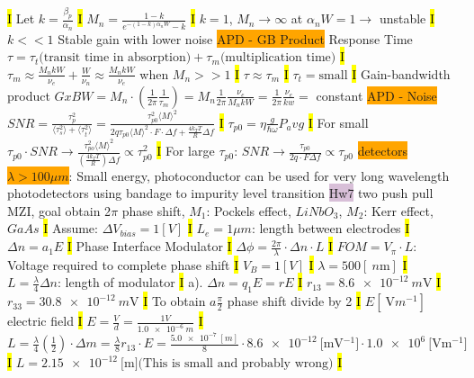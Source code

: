 \documentclass[fontsize=3]{scrartcl}
\begin{document}
\hl{I}
Let $k = \frac{\beta_p}{\alpha_n}$
\hl{I}
$M_n = \frac{1-k}{e^{-(1-k)\alpha_n W} - k}$
\hl{I}
$k=1$, $M_n \rightarrow \infty$ at $\alpha_n W = 1 \rightarrow $ unstable
\hl{I}
$k << 1$ Stable gain with lower noise 
\colorbox{Orange}{APD - GB Product}
Response Time $\tau = \tau_t \text{(transit time in absorption)} + \tau_m \text{(multiplication time)}$
\hl{I}
$\tau_{m} \approx \frac{M_n k W}{\nu_e} + \frac{W}{\nu_n} \approx \frac{M_n k W}{\nu_e}$ when $M_n >> 1$
\hl{I}
$\tau \approx \tau_m$
\hl{I}
$\tau_t = \text{small}$
\hl{I}
Gain-bandwidth product $GxBW = M_n \cdot(\frac{1}{2\pi} \frac{1}{\tau_m}) = M_n \frac{1}{2\pi} \frac{\nu_e}{M_n k W} = \frac{1}{2\pi} \frac{\nu_e}{k w} =$ constant
\colorbox{Orange}{APD - Noise} 
$SNR= \frac{\tau_p^2}{\langle \tau_s^2 \rangle + \langle \tau_t^2 \rangle} = \frac{\tau_{p0}^{2} \langle M \rangle^2 } {2q \tau_{p0} \langle M \rangle^2 \cdot F \cdot \Delta f + \frac{4k_T T}{R} \Delta f}$
\hl{I}
$\tau_{p0} = \eta \frac{g}{\hbar \omega} P_avg$
\hl{I}
For small $\tau_{p0} \cdot SNR \rightarrow \frac{\tau_{po}^2 \langle M \rangle^2}{(\frac{4k_T T}{R}) \Delta f} \propto \tau_{p0}^{2}$
\hl{I}
For large $\tau_{p0}$: $SNR\rightarrow \frac{\tau_{p0}}{2 q \cdot F \Delta f} \propto \tau_{p0}$
\colorbox{Orange}{detectors $\lambda > 100\mu m$}: Small energy, photoconductor can be used for very long wavelength photodetectors using bandage to impurity level transition
\colorbox{Thistle}{Hw7}
two push pull MZI, goal obtain 2$\pi$ phase shift, $M_1$: Pockels effect, $LiNbO_3$, $M_2$: Kerr effect, $GaAs$ 
\hl{I}
Assume: $\Delta V_{bias} = 1 [ V ]$
\hl{I}
$L_e = 1\mu m$: length between electrodes
\hl{I}
$\Delta n = a_1 E$
\hl{I}
Phase Interface Modulator
\hl{I}
$\Delta \phi = \frac{2 \pi}{\lambda} \cdot \Delta n \cdot L$
\hl{I}
$FOM = V_{\pi} \cdot L$: Voltage required to complete phase shift
\hl{I}
$V_{B} = 1[ V ]$
\hl{I}
$\lambda = 500 [ \SI{}{n \meter } ]$
\hl{I}
$L = \frac{\lambda}{4} \Delta n$: length of modulator
\hl{I}
a). $\Delta n = q_1 E = r E$
\hl{I}
$r_{13} =  \SI{8.6e-12}{ m \volt } $
\hl{I}
$r_{33} =  \SI{30.8e-12}{ m \volt } $
\hl{I}
To obtain $a\frac{\pi}{2}$ phase shift divide by 2
\hl{I}
$E[ \SI{}{ \volt m^{-1} } ]$ electric field
\hl{I}
$E = \frac{V}{d} = \frac{1 V}{ \SI{1.0e-6}{ m } }$
\hl{I}
$L = \frac{ \lambda }{ 4 }(\frac{1}{2}) \cdot \Delta m = \frac{ \lambda }{8}r_{13} \cdot E = \frac{ \SI{ 5.0e-7 }{ [m] }}{8} \cdot \SI{ 8.6e-12}{[\meter \volt^{-1}]} \cdot \SI{ 1.0e6}{[\volt \meter^{-1}]}$
\hl{I}
$L = \SI{ 2.15e-12 }{ [\meter] } \text{(This is small and probably wrong)} $
\hl{I}
\end{document}
